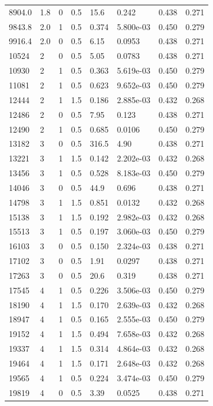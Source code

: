 \documentclass[preview]{standalone}
\begin{document}
{{\begin{tabular}{L{1.2cm}C{1.2cm} C{0.3cm}C{0.5cm} C{1.4cm}C{1.4cm} C{1.4cm}C{1.4cm}}
  8904.0  &   1.8  & 0     & 0.5 &  15.6  & 0.242  & 0.438 &  0.271   \\ 
  9843.8  &   2.0  & 1     & 0.5 &  0.374  & 5.800e-03  & 0.450 &  0.279   \\ 
  9916.4  &   2.0  & 0     & 0.5 &  6.15  & 0.0953  & 0.438 &  0.271   \\ 
  10524  &     2  & 0     & 0.5 &  5.05  & 0.0783  & 0.438 &  0.271   \\ 
  10930  &     2  & 1     & 0.5 &  0.363  & 5.619e-03  & 0.450 &  0.279   \\ 
  11081  &     2  & 1     & 0.5 &  0.623  & 9.652e-03  & 0.450 &  0.279   \\ 
  12444  &     2  & 1     & 1.5 &  0.186  & 2.885e-03  & 0.432 &  0.268   \\ 
  12486  &     2  & 0     & 0.5 &  7.95  & 0.123  & 0.438 &  0.271   \\ 
  12490  &     2  & 1     & 0.5 &  0.685  & 0.0106  & 0.450 &  0.279   \\ 
  13182  &     3  & 0     & 0.5 &  316.5  & 4.90  & 0.438 &  0.271   \\ 
  13221  &     3  & 1     & 1.5 &  0.142  & 2.202e-03  & 0.432 &  0.268   \\ 
  13456  &     3  & 1     & 0.5 &  0.528  & 8.183e-03  & 0.450 &  0.279   \\ 
  14046  &     3  & 0     & 0.5 &  44.9  & 0.696  & 0.438 &  0.271   \\ 
  14798  &     3  & 1     & 1.5 &  0.851  & 0.0132  & 0.432 &  0.268   \\ 
  15138  &     3  & 1     & 1.5 &  0.192  & 2.982e-03  & 0.432 &  0.268   \\ 
  15513  &     3  & 1     & 0.5 &  0.197  & 3.060e-03  & 0.450 &  0.279   \\ 
  16103  &     3  & 0     & 0.5 &  0.150  & 2.324e-03  & 0.438 &  0.271   \\ 
  17102  &     3  & 0     & 0.5 &  1.91  & 0.0297  & 0.438 &  0.271   \\ 
  17263  &     3  & 0     & 0.5 &  20.6  & 0.319  & 0.438 &  0.271   \\ 
  17545  &     4  & 1     & 0.5 &  0.226  & 3.506e-03  & 0.450 &  0.279   \\ 
  18190  &     4  & 1     & 1.5 &  0.170  & 2.639e-03  & 0.432 &  0.268   \\ 
  18947  &     4  & 1     & 0.5 &  0.165  & 2.555e-03  & 0.450 &  0.279   \\ 
  19152  &     4  & 1     & 1.5 &  0.494  & 7.658e-03  & 0.432 &  0.268   \\ 
  19337  &     4  & 1     & 1.5 &  0.314  & 4.864e-03  & 0.432 &  0.268   \\ 
  19464  &     4  & 1     & 1.5 &  0.171  & 2.648e-03  & 0.432 &  0.268   \\ 
  19565  &     4  & 1     & 0.5 &  0.224  & 3.474e-03  & 0.450 &  0.279   \\ 
  19819  &     4  & 0     & 0.5 &  3.39  & 0.0525  & 0.438 &  0.271   \\ 
\hline 
\end{tabular} 

}}
\end{document}
